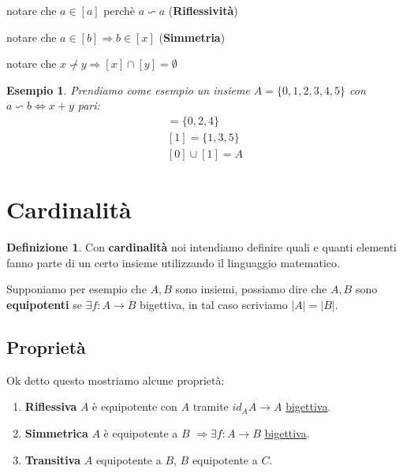\documentclass{article}
\newtheorem{exmp}{Esempio}[section]
\theoremstyle{definition}
\newtheorem{definition}{Definizione}[section]
\begin{document}
\begin{tcolorbox}
notare che $a \in [a]$ perchè $a \backsim a$ (\textbf{Riflessività}) \par
notare che $ a \in [b] \Rightarrow b \in [x] $ (\textbf{Simmetria})\par
notare che $ x \not \backsim y \Rightarrow [x]\cap[y] = \emptyset $ 
\end{tcolorbox}

\begin{exmp}
        Prendiamo come esempio un insieme $ A = \{0,1,2,3,4,5\} $  con $ a \backsim b \Leftrightarrow x + y $ pari:   
        \begin{align*}
                [0] = \{0, 2, 4\} \\
                [1] = \{1, 3, 5\} \\
                [0] \cup [1] = A
        \end{align*}
\end{exmp}




\newpage
\section{Cardinalità}\label{sec:cardinalità}
\begin{definition}
Con \textbf{cardinalità} noi intendiamo definire quali e quanti elementi fanno parte di un certo insieme utilizzando il linguaggio matematico. \par
\end{definition}
Supponiamo per esempio che $A,B$ sono insiemi, possiamo dire che $A,B$ sono \textbf{equipotenti} se $\exists f:A \rightarrow B$ bigettiva, in tal caso scriviamo $|A| = |B|$. \par


\subsection{Proprietà}
Ok detto questo mostriamo alcune proprietà:
\begin{tcolorbox}
\begin{enumerate}
        \item \textbf{Riflessiva} $A$ è equipotente con $A$ tramite $id_A A \rightarrow A$ \underline{bigettiva}.
        \item \textbf{Simmetrica} $A$ è equipotente a $B$ $\Rightarrow \exists f:A \rightarrow B$ \underline{{bigettiva}}.
        \item \textbf{Transitiva} $A$ equipotente a $B$, $B$ equipotente a $C$.	
\end{enumerate}
\end{tcolorbox}
\end{document}
